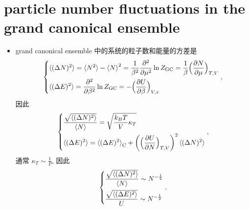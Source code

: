 \section{particle number fluctuations in the grand canonical ensemble}
\begin{itemize}
	\item grand canonical ensemble 中的系统的粒子数和能量的方差是
	\begin{equation}
		\begin{dcases}
			\braket{(\Delta N)^2} = \braket{N^2} - \braket{N}^2 = \frac{1}{\beta^2} \frac{\partial^2}{\partial \mu^2} \ln Z_\text{GC} = \frac{1}{\beta} \Big( \frac{\partial N}{\partial \mu} \Big)_{T, V} \\
			\braket{(\Delta E)^2} = \frac{\partial^2}{\partial \beta^2} \ln Z_\text{GC} = - \Big( \frac{\partial U}{\partial \beta} \Big)_{V, z}
		\end{dcases},
	\end{equation}
	因此
	\begin{equation}
		\begin{dcases}
			\frac{\sqrt{\braket{(\Delta N)^2}}}{\braket{N}} = \sqrt{\frac{k_B T}{V} \kappa_T} \\
			\braket{(\Delta E)^2} = \braket{(\Delta E)^2}_\text{C} + \bigg( \Big( \frac{\partial U}{\partial N} \Big)_{T, V} \bigg)^2 \braket{(\Delta N)^2}
		\end{dcases},
	\end{equation}
	通常 $\kappa_T \sim \frac{1}{P}$, 因此
	\begin{equation}
		\begin{dcases}
			\frac{\sqrt{\braket{(\Delta N)^2}}}{\braket{N}} \sim N^{- \frac{1}{2}} \\
			\frac{\sqrt{\braket{(\Delta E)^2}}}{U} \sim N^{- \frac{1}{2}}
		\end{dcases}.
	\end{equation}
	

\end{itemize}
